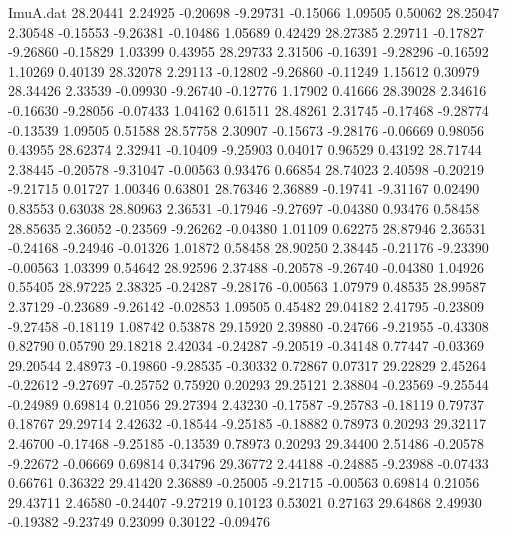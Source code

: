 \begin{filecontents}{ImuA.dat}
  28.20441    2.24925   -0.20698   -9.29731   -0.15066    1.09505    0.50062
  28.25047    2.30548   -0.15553   -9.26381   -0.10486    1.05689    0.42429
  28.27385    2.29711   -0.17827   -9.26860   -0.15829    1.03399    0.43955
  28.29733    2.31506   -0.16391   -9.28296   -0.16592    1.10269    0.40139
  28.32078    2.29113   -0.12802   -9.26860   -0.11249    1.15612    0.30979
  28.34426    2.33539   -0.09930   -9.26740   -0.12776    1.17902    0.41666
  28.39028    2.34616   -0.16630   -9.28056   -0.07433    1.04162    0.61511
  28.48261    2.31745   -0.17468   -9.28774   -0.13539    1.09505    0.51588
  28.57758    2.30907   -0.15673   -9.28176   -0.06669    0.98056    0.43955
  28.62374    2.32941   -0.10409   -9.25903    0.04017    0.96529    0.43192
  28.71744    2.38445   -0.20578   -9.31047   -0.00563    0.93476    0.66854
  28.74023    2.40598   -0.20219   -9.21715    0.01727    1.00346    0.63801
  28.76346    2.36889   -0.19741   -9.31167    0.02490    0.83553    0.63038
  28.80963    2.36531   -0.17946   -9.27697   -0.04380    0.93476    0.58458
  28.85635    2.36052   -0.23569   -9.26262   -0.04380    1.01109    0.62275
  28.87946    2.36531   -0.24168   -9.24946   -0.01326    1.01872    0.58458
  28.90250    2.38445   -0.21176   -9.23390   -0.00563    1.03399    0.54642
  28.92596    2.37488   -0.20578   -9.26740   -0.04380    1.04926    0.55405
  28.97225    2.38325   -0.24287   -9.28176   -0.00563    1.07979    0.48535
  28.99587    2.37129   -0.23689   -9.26142   -0.02853    1.09505    0.45482
  29.04182    2.41795   -0.23809   -9.27458   -0.18119    1.08742    0.53878
  29.15920    2.39880   -0.24766   -9.21955   -0.43308    0.82790    0.05790
  29.18218    2.42034   -0.24287   -9.20519   -0.34148    0.77447   -0.03369
  29.20544    2.48973   -0.19860   -9.28535   -0.30332    0.72867    0.07317
  29.22829    2.45264   -0.22612   -9.27697   -0.25752    0.75920    0.20293
  29.25121    2.38804   -0.23569   -9.25544   -0.24989    0.69814    0.21056
  29.27394    2.43230   -0.17587   -9.25783   -0.18119    0.79737    0.18767
  29.29714    2.42632   -0.18544   -9.25185   -0.18882    0.78973    0.20293
  29.32117    2.46700   -0.17468   -9.25185   -0.13539    0.78973    0.20293
  29.34400    2.51486   -0.20578   -9.22672   -0.06669    0.69814    0.34796
  29.36772    2.44188   -0.24885   -9.23988   -0.07433    0.66761    0.36322
  29.41420    2.36889   -0.25005   -9.21715   -0.00563    0.69814    0.21056
  29.43711    2.46580   -0.24407   -9.27219    0.10123    0.53021    0.27163
  29.64868    2.49930   -0.19382   -9.23749    0.23099    0.30122   -0.09476

\end{filecontents}
